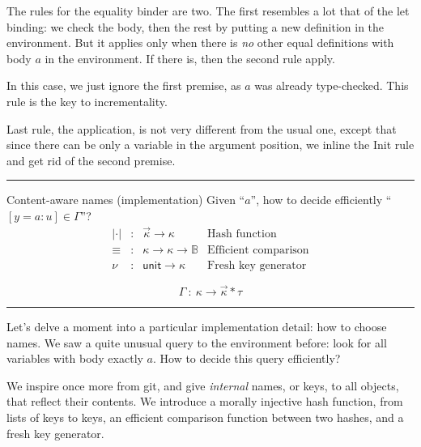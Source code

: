 \documentclass[ignorenonframetext,red]{beamer}
\begin{document}
The rules for the equality binder are two. The first resembles a lot
that of the \textsf{let} binding: we check the body, then the rest by
putting a new definition in the environment. But it applies only when
there is \emph{no} other equal definitions with body $a$ in the
environment. If there is, then the second rule apply.

In this case, we just ignore the first premise, as $a$ was already
type-checked. This rule is the key to incrementality.

Last rule, the application, is not very different from the usual one,
except that since there can be only a variable in the argument
position, we inline the Init rule and get rid of the second premise.

\hrule
\begin{frame}{Content-aware names (implementation)}
  Given ``$a$'', how to decide efficiently ``$[y = a : u] \in
  \Gamma$''?
  \pause
  \[ \begin{array}{lllr}
    | \cdot | &:& \vec\kappa \rightarrow \kappa & \text{Hash function}\\
    \equiv    &:& \kappa \rightarrow \kappa \rightarrow \mathbb{B} & \text{Efficient comparison}\\
    \nu       &:& \textsf{unit} \rightarrow \kappa & \text{Fresh key generator}
  \end{array} \]
  \pause
  \pause
  \Large
  \[ \Gamma\ :\ \kappa \to \vec\kappa * \tau \]
\end{frame}
\hrule

Let's delve a moment into a particular implementation detail: how to
choose names. We saw a quite unusual query to the environment before:
look for all variables with body exactly $a$. How to decide this query
efficiently?

We inspire once more from \textsf{git}, and give \emph{internal}
names, or keys, to all objects, that reflect their contents. We
introduce a morally injective hash function, from lists of keys to
keys, an efficient comparison function between two hashes, and a fresh
key generator.
\end{document}
